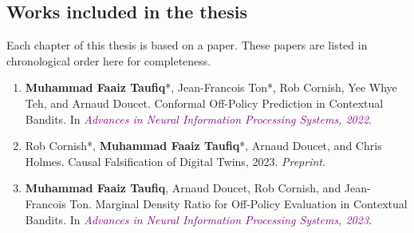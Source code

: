 \subsection{Works included in the thesis}
Each chapter of this thesis is based on a paper. These papers are listed in chronological order here for completeness.
\begin{enumerate}
    \item \textbf{Muhammad Faaiz Taufiq}*, Jean-Francois Ton*, Rob Cornish, Yee Whye Teh, and Arnaud Doucet.
    Conformal Off-Policy Prediction in Contextual Bandits. In \textit{\textcolor{purple}{Advances in Neural Information Processing
    Systems, 2022}}. \citep{taufiq2022conformal}
    \item Rob Cornish*, \textbf{Muhammad Faaiz Taufiq}*, Arnaud Doucet, and Chris Holmes. Causal Falsification
    of Digital Twins, 2023. \textit{Preprint}. \citep{cornish2023causalfalsificationdigitaltwins}
    \item \textbf{Muhammad Faaiz Taufiq}, Arnaud Doucet, Rob Cornish, and Jean-Francois Ton. Marginal Density Ratio for Off-Policy Evaluation in Contextual Bandits. In 
    \textit{\textcolor{purple}{Advances in Neural Information Processing Systems, 2023}}. \citep{taufiq2023marginal}
\end{enumerate}

